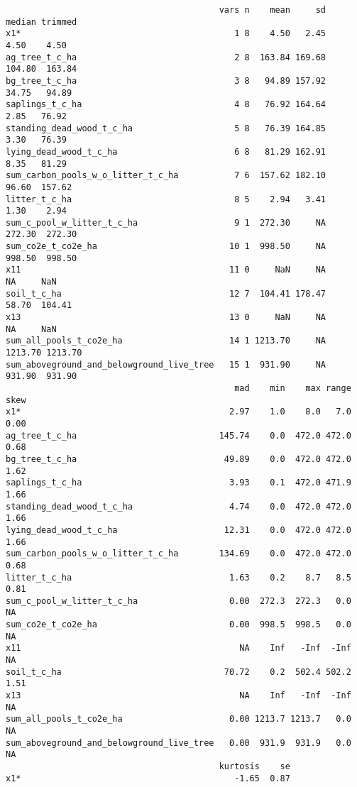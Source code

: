 \documentclass[
]{article}
\begin{document}
\begin{verbatim}
                                          vars n    mean     sd  median trimmed
x1*                                          1 8    4.50   2.45    4.50    4.50
ag_tree_t_c_ha                               2 8  163.84 169.68  104.80  163.84
bg_tree_t_c_ha                               3 8   94.89 157.92   34.75   94.89
saplings_t_c_ha                              4 8   76.92 164.64    2.85   76.92
standing_dead_wood_t_c_ha                    5 8   76.39 164.85    3.30   76.39
lying_dead_wood_t_c_ha                       6 8   81.29 162.91    8.35   81.29
sum_carbon_pools_w_o_litter_t_c_ha           7 6  157.62 182.10   96.60  157.62
litter_t_c_ha                                8 5    2.94   3.41    1.30    2.94
sum_c_pool_w_litter_t_c_ha                   9 1  272.30     NA  272.30  272.30
sum_co2e_t_co2e_ha                          10 1  998.50     NA  998.50  998.50
x11                                         11 0     NaN     NA      NA     NaN
soil_t_c_ha                                 12 7  104.41 178.47   58.70  104.41
x13                                         13 0     NaN     NA      NA     NaN
sum_all_pools_t_co2e_ha                     14 1 1213.70     NA 1213.70 1213.70
sum_aboveground_and_belowground_live_tree   15 1  931.90     NA  931.90  931.90
                                             mad    min    max range skew
x1*                                         2.97    1.0    8.0   7.0 0.00
ag_tree_t_c_ha                            145.74    0.0  472.0 472.0 0.68
bg_tree_t_c_ha                             49.89    0.0  472.0 472.0 1.62
saplings_t_c_ha                             3.93    0.1  472.0 471.9 1.66
standing_dead_wood_t_c_ha                   4.74    0.0  472.0 472.0 1.66
lying_dead_wood_t_c_ha                     12.31    0.0  472.0 472.0 1.66
sum_carbon_pools_w_o_litter_t_c_ha        134.69    0.0  472.0 472.0 0.68
litter_t_c_ha                               1.63    0.2    8.7   8.5 0.81
sum_c_pool_w_litter_t_c_ha                  0.00  272.3  272.3   0.0   NA
sum_co2e_t_co2e_ha                          0.00  998.5  998.5   0.0   NA
x11                                           NA    Inf   -Inf  -Inf   NA
soil_t_c_ha                                70.72    0.2  502.4 502.2 1.51
x13                                           NA    Inf   -Inf  -Inf   NA
sum_all_pools_t_co2e_ha                     0.00 1213.7 1213.7   0.0   NA
sum_aboveground_and_belowground_live_tree   0.00  931.9  931.9   0.0   NA
                                          kurtosis    se
x1*                                          -1.65  0.87

\end{verbatim}
\end{document}
